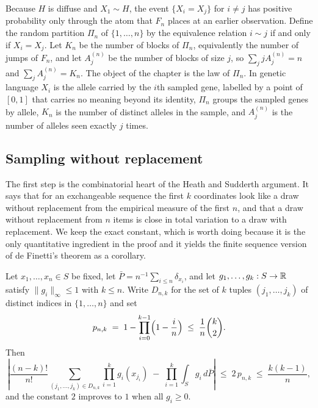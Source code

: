 Because $H$ is diffuse and $X_1 \sim H$, the event $\{X_i = X_j\}$ for $i \ne j$ has
positive probability only through the atom that $F_n$ places at an earlier
observation. Define the random partition $\Pi_n$ of $\{1,\dots,n\}$ by the equivalence
relation $i \sim j$ if and only if $X_i = X_j$. Let $K_n$ be the number of blocks of
$\Pi_n$, equivalently the number of jumps of $F_n$, and let $A_j^{(n)}$ be the number
of blocks of size $j$, so $\sum_j j A_j^{(n)} = n$ and $\sum_j A_j^{(n)} = K_n$. The
object of the chapter is the law of $\Pi_n$. In genetic language $X_i$ is the allele
carried by the $i$th sampled gene, labelled by a point of $[0,1]$ that carries no
meaning beyond its identity, $\Pi_n$ groups the sampled genes by allele, $K_n$ is the
number of distinct alleles in the sample, and $A_j^{(n)}$ is the number of alleles
seen exactly $j$ times.

\subsection{Sampling without replacement}
\label{esf:sec:wor}

The first step is the combinatorial heart of the Heath and Sudderth argument. It says
that for an exchangeable sequence the first $k$ coordinates look like a draw without
replacement from the empirical measure of the first $n$, and that a draw without
replacement from $n$ items is close in total variation to a draw with replacement. We
keep the exact constant, which is worth doing because it is the only quantitative
ingredient in the proof and it yields the finite sequence version of de Finetti's
theorem as a corollary.

\begin{lemma}
\label{esf:lem:wor}
Let $x_1, \dots, x_n \in S$ be fixed, let $\bar{P} = n^{-1}\sum_{i \le n}\delta_{x_i}$,
and let $g_1,\dots,g_k : S \to \mathbb{R}$ satisfy $\|g_i\|_\infty \le 1$ with $k \le n$.
Write $D_{n,k}$ for the set of $k$ tuples $(j_1,\dots,j_k)$ of distinct indices in
$\{1,\dots,n\}$ and set
\[
p_{n,k} \; = \; 1 - \prod_{i=0}^{k-1}\Bigl(1 - \frac{i}{n}\Bigr)
\; \le \; \frac{1}{n}\binom{k}{2}.
\]
Then
\[
\left| \frac{(n-k)!}{n!} \sum_{(j_1,\dots,j_k) \in D_{n,k}} \prod_{i=1}^{k} g_i(x_{j_i})
\; - \; \prod_{i=1}^{k} \int_S g_i \, d\bar{P} \right|
\; \le \; 2 \, p_{n,k} \; \le \; \frac{k(k-1)}{n},
\]
and the constant $2$ improves to $1$ when all $g_i \ge 0$.
\end{lemma}

